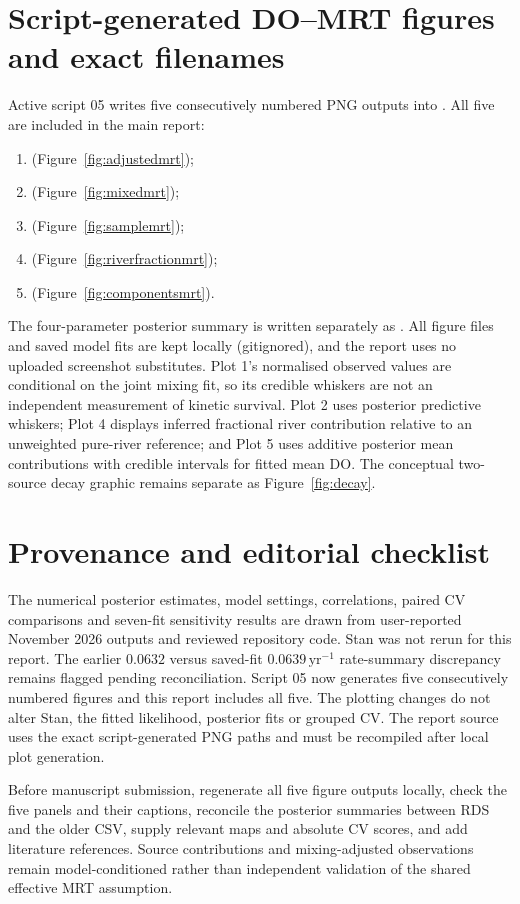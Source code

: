 \documentclass[11pt,a4paper]{article}
\newcommand{\yr}{\mathrm{yr}}
\begin{document}
\section{Script-generated DO--MRT figures and exact filenames}
\label{sec:appendixfigures}
Active script 05 writes five consecutively numbered PNG outputs into . All five are included in the main report:
\begin{enumerate}[leftmargin=18pt,itemsep=2pt]
\item {} (Figure~\ref{fig:adjustedmrt});
\item {} (Figure~\ref{fig:mixedmrt});
\item {} (Figure~\ref{fig:samplemrt});
\item {} (Figure~\ref{fig:riverfractionmrt});
\item {} (Figure~\ref{fig:componentsmrt}).
\end{enumerate}
The four-parameter posterior summary is written separately as . All figure files and saved model fits are kept locally (gitignored), and the report uses no uploaded screenshot substitutes. Plot 1's normalised observed values are conditional on the joint mixing fit, so its credible whiskers are not an independent measurement of kinetic survival. Plot 2 uses posterior predictive whiskers; Plot 4 displays inferred fractional river contribution relative to an unweighted pure-river reference; and Plot 5 uses additive posterior mean contributions with credible intervals for fitted mean DO. The conceptual two-source decay graphic remains separate as Figure~\ref{fig:decay}.

\section{Provenance and editorial checklist}
The numerical posterior estimates, model settings, correlations, paired CV comparisons and seven-fit sensitivity results are drawn from user-reported November 2026 outputs and reviewed repository code. Stan was not rerun for this report. The earlier $0.0632$ versus saved-fit $0.0639\,\yr^{-1}$ rate-summary discrepancy remains flagged pending reconciliation. Script 05 now generates five consecutively numbered figures and this report includes all five. The plotting changes do not alter Stan, the fitted likelihood, posterior fits or grouped CV. The report source uses the exact script-generated PNG paths and must be recompiled after local plot generation.

Before manuscript submission, regenerate all five figure outputs locally, check the five panels and their captions, reconcile the posterior summaries between RDS and the older CSV, supply relevant maps and absolute CV scores, and add literature references. Source contributions and mixing-adjusted observations remain model-conditioned rather than independent validation of the shared effective MRT assumption.
\end{document}

